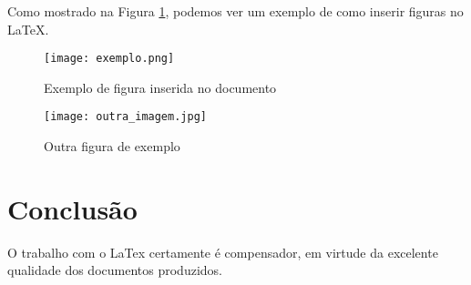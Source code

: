 \documentclass[11pt,a4paper,twocolumn]{article}
\begin{document}
Como mostrado na Figura \ref{fig:exemplo}, podemos ver um exemplo de como inserir figuras no LaTeX.

\begin{figure}[h]
  \centering
  \texttt{[image: exemplo.png]}
  \caption{Exemplo de figura inserida no documento}
  \label{fig:exemplo}
\end{figure}

\begin{figure}[h]
  \centering
  \texttt{[image: outra\_imagem.jpg]}
  \caption{Outra figura de exemplo}
\end{figure}

\section{Conclusão}
O trabalho com o LaTex certamente é compensador, em virtude da excelente qualidade dos documentos produzidos.
\end{document}
